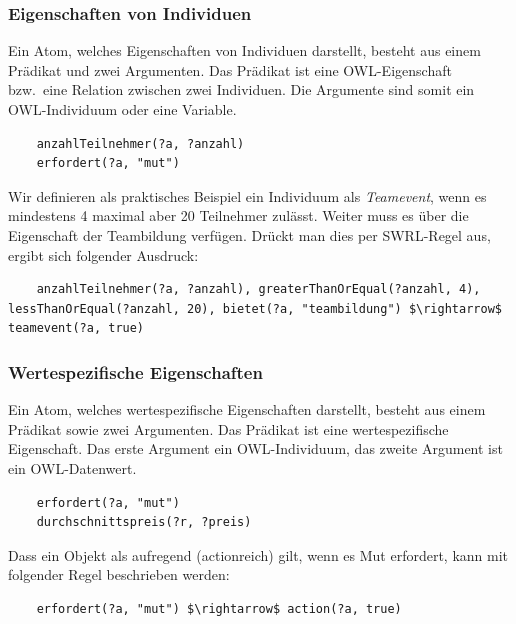 \subsubsection{Eigenschaften von Individuen}
\label{ssubsec:swrl_aufbau_atomaretypen_eigenschaftenvonindividuen}
Ein Atom, welches Eigenschaften von Individuen darstellt, besteht aus einem Prädikat und zwei Argumenten. Das Prädikat ist eine OWL-Eigenschaft bzw.\ eine Relation zwischen zwei Individuen. Die Argumente sind somit ein OWL-Individuum oder eine Variable.
\lstset{language=XML}
\begin{lstlisting}
    anzahlTeilnehmer(?a, ?anzahl)
    erfordert(?a, "mut")
\end{lstlisting}

Wir definieren als praktisches Beispiel ein Individuum als \textit{Teamevent}, wenn es mindestens 4 maximal aber 20 Teilnehmer zulässt. Weiter muss es über die Eigenschaft der Teambildung verfügen. Drückt man dies per SWRL-Regel aus, ergibt sich folgender Ausdruck:

\lstset{language=XML}
\begin{lstlisting}
    anzahlTeilnehmer(?a, ?anzahl), greaterThanOrEqual(?anzahl, 4), lessThanOrEqual(?anzahl, 20), bietet(?a, "teambildung") $\rightarrow$ teamevent(?a, true)
\end{lstlisting}

\subsubsection{Wertespezifische Eigenschaften}
\label{ssubsec:swrl_aufbau_atomaretypen_wertespezifischeeigenschaften}
Ein Atom, welches wertespezifische Eigenschaften darstellt, besteht aus einem Prädikat sowie zwei Argumenten. Das Prädikat ist eine wertespezifische Eigenschaft. Das erste Argument ein OWL-Individuum, das zweite Argument ist ein OWL-Datenwert.
\lstset{language=XML}
\begin{lstlisting}
    erfordert(?a, "mut")
    durchschnittspreis(?r, ?preis)
\end{lstlisting}

Dass ein Objekt als aufregend (actionreich) gilt, wenn es Mut erfordert, kann mit folgender Regel beschrieben werden:
\lstset{language=XML}
\begin{lstlisting}
    erfordert(?a, "mut") $\rightarrow$ action(?a, true)
\end{lstlisting}

